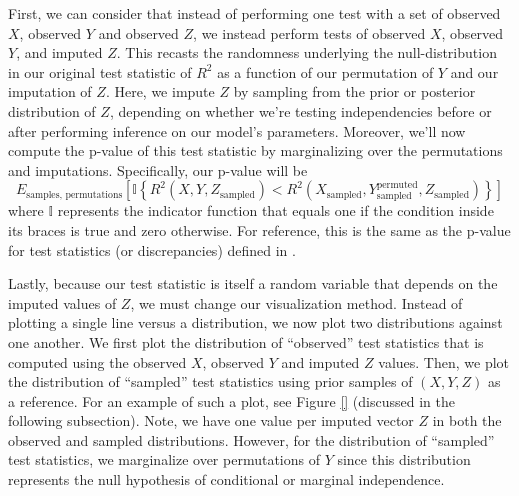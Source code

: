 First, we can consider that instead of performing one test with a set of observed $X$, observed $Y$ and observed $Z$, we instead perform tests of observed $X$, observed $Y$, and imputed $Z$.
This recasts the randomness underlying the null-distribution in our original test statistic of $R^2$ as a function of our permutation of $Y$ and our imputation of $Z$.
Here, we impute $Z$ by sampling from the prior or posterior distribution of $Z$, depending on whether we're testing independencies before or after performing inference on our model's parameters.
Moreover, we'll now compute the p-value of this test statistic by marginalizing over the permutations and imputations.
Specifically, our p-value will be
\begin{equation}
E_{\textrm{samples, permutations}} \left[ \mathbb{I} \left \lbrace R^2 \left( X, Y, Z_{\textrm{sampled}} \right) <  R^2 \left( X_{\textrm{sampled}}, Y_{\textrm{sampled}} ^{\textrm{permuted}}, Z_{\textrm{sampled}} \right) \right \rbrace \right]
\end{equation}
where $\mathbb{I}$ represents the indicator function that equals one if the condition inside its braces is true and zero otherwise.
For reference, this is the same as the p-value for test statistics (or discrepancies) defined in \citet[Eq. 7]{gelman_1996_posterior}.

Lastly, because our test statistic is itself a random variable that depends on the imputed values of $Z$, we must change our visualization method.
Instead of plotting a single line versus a distribution, we now plot two distributions against one another.
We first plot the distribution of ``observed'' test statistics that is computed using the observed $X$, observed $Y$ and imputed $Z$ values.
Then, we plot the distribution of ``sampled'' test statistics using prior samples of $\left( X, Y, Z \right)$ as a reference.
For an example of such a plot, see Figure \ref{} (discussed in the following subsection).
Note, we have one value per imputed vector $Z$ in both the observed and sampled distributions.
However, for the distribution of ``sampled'' test statistics, we marginalize over permutations of $Y$ since this distribution represents the null hypothesis of conditional or marginal independence.

